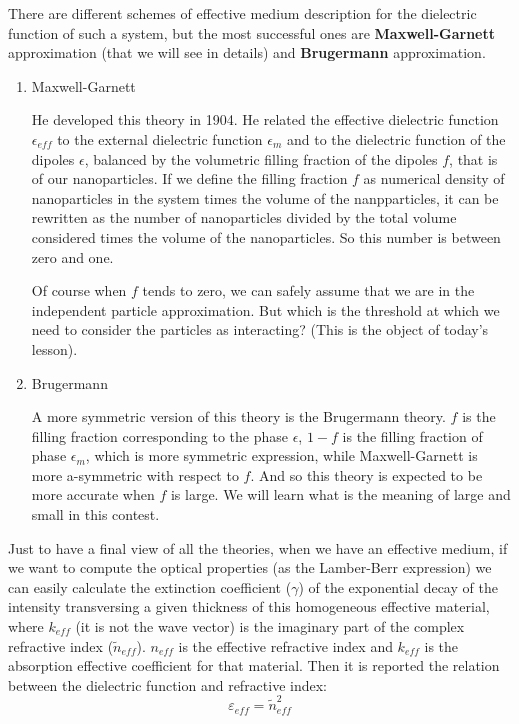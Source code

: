 \documentclass[../main/main.tex]{subfiles}
\begin{document}
There are different schemes of effective medium description for the dielectric function of such a system, but the most successful ones are \textbf{Maxwell-Garnett} approximation (that we will see in details) and \textbf{Brugermann} approximation.

\begin{enumerate}
    \item{Maxwell-Garnett}

    He developed this theory in 1904. He related the effective dielectric function $\epsilon_{eff}$ to the external dielectric function $\epsilon_{m}$ and to the dielectric function of the dipoles $\epsilon$, balanced by the volumetric filling fraction of the dipoles $f$, that is of our nanoparticles.
    If we define the filling fraction $f$ as numerical density of nanoparticles in the system times the volume of the nanpparticles, it can be rewritten as the number of nanoparticles divided by the total volume considered times the volume of the nanoparticles. So this number is between zero and one.

    Of course when $f$ tends to zero, we can safely assume that we are in the independent particle approximation. But which is the threshold at which we need to consider the particles as interacting? (This is the object of today's lesson).

    \item{Brugermann}

    A more symmetric version of this theory is the Brugermann theory. $f$ is the filling fraction corresponding to the phase $\epsilon$, $1-f$ is the filling fraction of phase $\epsilon_{m}$, which is more symmetric expression, while Maxwell-Garnett is more a-symmetric with respect to $f$.
    And so this theory is expected to be more accurate when $f$ is large.
    We will learn what is the meaning of large and small in this contest.

\end{enumerate}

Just to have a final view of all the theories, when we have an effective medium, if we want to compute the optical properties (as the Lamber-Berr expression) we can easily calculate the extinction coefficient ($\gamma$) of the exponential decay of the intensity transversing a given thickness of this homogeneous effective material, where $k_{eff}$ (it is not the wave vector) is the imaginary part of the complex refractive index ($\tilde{n}_{eff}$). $n_{eff}$ is the effective refractive index and $k_{eff}$ is the absorption effective coefficient for that material. Then it is reported the relation between the dielectric function and refractive index:
\begin{equation*}
  \varepsilon _{eff} = \widetilde{n}_{eff}^2
\end{equation*}
\end{document}
